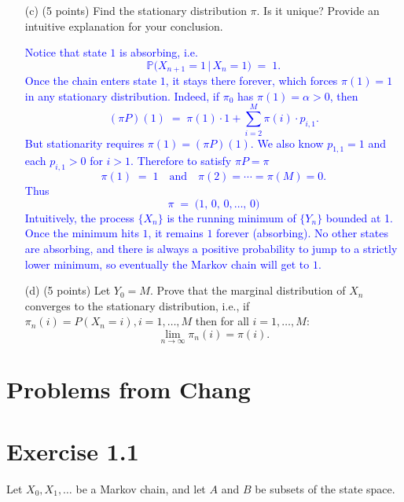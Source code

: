 \documentclass{article}
\begin{document}
\begin{enumerate}
    \item[(c)] (5 points) Find the stationary distribution $\pi$. Is it unique? Provide an intuitive explanation for your conclusion.

    \textcolor{blue}{
Notice that state \(1\) is absorbing, i.e.\
\[
  \mathbb{P}\bigl(X_{n+1} = 1 \,\big\vert\, X_n = 1\bigr)
  \;=\;1.
\]
Once the chain enters state \(1\), it stays there forever, which forces \(\pi(1)=1\) in any stationary distribution.  Indeed, if \(\pi_0\) has \(\pi(1)=\alpha>0\), then
\[
  (\pi P)(1) 
  \;=\; \pi(1) \cdot 1 + \sum_{i=2}^M \pi(i)\cdot p_{i,1}.
\]
But stationarity requires \(\pi(1) = (\pi P)(1)\).  We also know \(p_{1,1}=1\) and each \(p_{i,1}>0\) for \(i>1\). Therefore to satisfy \(\pi P=\pi\)
\[
  \pi(1) \;=\;1
  \quad\text{and}\quad
  \pi(2)=\cdots=\pi(M)=0.
\]
Thus
\[
 \pi \;=\; \bigl(1,\,0,\,0,\dots,\,0\bigr)
\]
Intuitively, the process \(\{X_n\}\) is the running minimum of \(\{Y_n\}\) bounded at 1.  Once the minimum hits \(1\), it remains \(1\) forever (absorbing).  No other states are absorbing, and there is always a positive probability to jump to a strictly lower minimum, so eventually the Markov chain will get to \(1\). 
}

    \item[(d)] (5 points) Let $Y_0 = M$. Prove that the marginal distribution of $X_n$ converges to the stationary distribution, i.e., if $\pi_n(i) = P(X_n = i), i = 1, \ldots, M$ then for all $i = 1, \ldots, M$:
    \[
    \lim_{n \to \infty} \pi_n(i) = \pi(i).
    \]

    \textcolor{blue}{}

\end{enumerate}

\section*{Problems from Chang}

\section*{Exercise 1.1}
Let $X_0, X_1, \ldots$ be a Markov chain, and let $A$ and $B$ be subsets of the state space.
\end{document}
